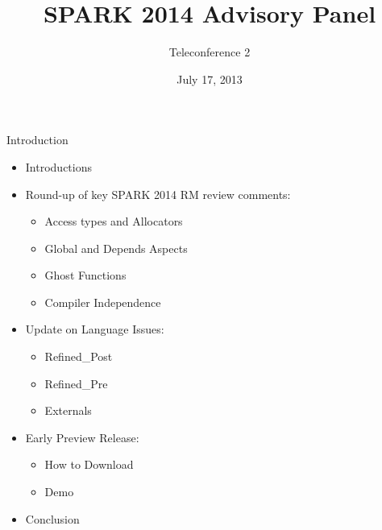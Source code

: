 \documentclass{beamer}
\title{SPARK 2014 Advisory Panel}
\subtitle{Teleconference 2}
\date{July 17, 2013}
\begin{document}
\begin{altrantitle}
\end{altrantitle}

\begin{frame}{Introduction}

  \begin{itemize}

  \item Introductions
  \item Round-up of key SPARK 2014 RM review comments:
    \begin{itemize}
    \item Access types and Allocators
    \item Global and Depends Aspects
    \item Ghost Functions
    \item Compiler Independence
    \end{itemize}
  \item Update on Language Issues: 
    \begin{itemize}
    \item Refined\_Post
    \item Refined\_Pre
    \item Externals
    \end{itemize}
  \item Early Preview Release:
    \begin{itemize}
    \item How to Download
    \item Demo
    \end{itemize}
  \item Conclusion

  \end{itemize}

\end{frame}
\end{document}
